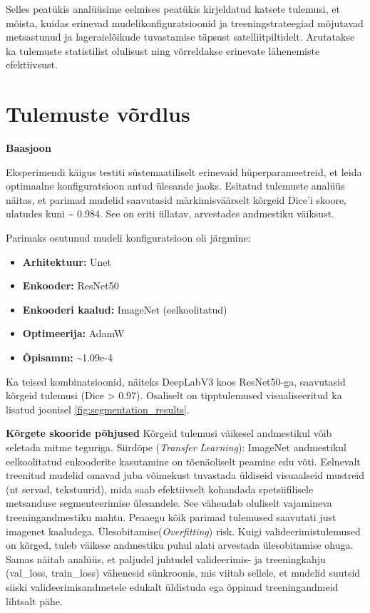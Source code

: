 Selles peatükis analüüsime eelmises peatükis kirjeldatud katsete tulemusi, et mõista, kuidas erinevad mudelikonfiguratsioonid ja treeningstrateegiad mõjutavad metsastunud ja lageraielõikude tuvastamise täpsust satelliitpiltidelt. Arutatakse ka tulemuste statistilist olulisust ning võrreldakse erinevate lähenemiste efektiivsust.
\section{Tulemuste võrdlus}
\textbf{Baasjoon}

Eksperimendi käigus testiti süstemaatiliselt erinevaid hüperparameetreid, et leida optimaalne konfiguratsioon antud ülesande jaoks. 
Esitatud tulemuste analüüs näitas, et parimad mudelid
saavutasid märkimisväärselt kõrgeid Dice'i skoore, ulatudes kuni \textasciitilde
0.984. See on eriti üllatav, arvestades andmestiku väiksust.

Parimaks osutunud mudeli konfiguratsioon oli järgmine:
\begin{itemize}
  \item \textbf{Arhitektuur:} Unet
  \item \textbf{Enkooder:} ResNet50
  \item \textbf{Enkooderi kaalud:} ImageNet (eelkoolitatud)
  \item \textbf{Optimeerija:} AdamW
  \item \textbf{Õpisamm:} \textasciitilde 1.09e-4
\end{itemize}

Ka teised kombinatsioonid,
näiteks DeepLabV3 koos ResNet50-ga, saavutasid kõrgeid tulemusi (Dice > 0.97).
Osaliselt on tipptulemused visualiseeritud ka lisatud joonisel \ref{fig:segmentation_results}.

\textbf{Kõrgete skooride põhjused}
Kõrgeid tulemusi väikesel andmestikul võib seletada mitme teguriga.
Siirdõpe (\textit{Transfer Learning}): ImageNet andmestikul eelkoolitatud enkooderite
kasutamine on tõenäoliselt peamine edu võti. Eelnevalt treenitud mudelid omavad
juba võimekust tuvastada üldiseid visuaalseid mustreid (nt servad, tekstuurid),
mida saab efektiivselt kohandada spetsiifilisele metsanduse segmenteerimise
ülesandele. See vähendab oluliselt vajamineva treeningandmestiku mahtu. Peaaegu
kõik parimad tulemused saavutati just imagenet kaaludega. 
Ülesobitamise(\textit{Overfitting}) risk. Kuigi valideerimistulemused on kõrged, tuleb väikese
andmestiku puhul alati arvestada ülesobitamise ohuga. Samas näitab analüüs, et paljudel juhtudel valideerimis- ja treeningkahju
(val\_loss, train\_loss) vähenesid sünkroonis, mis viitab sellele, et mudelid
suutsid siiski valideerimisandmetele edukalt üldistuda ega õppinud
treeningandmeid lihtsalt pähe.


